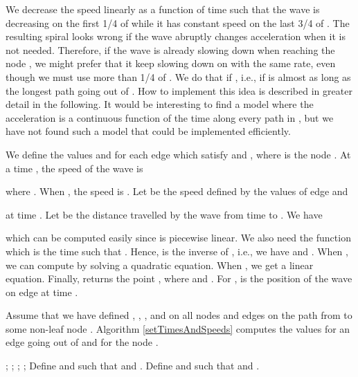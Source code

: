 \documentclass[3p]{elsarticle}
\begin{document}
We decrease the speed linearly
as a function of time such that the wave is decreasing on the first 1/4 of 
while it has constant speed on the last 3/4 of .
The resulting spiral looks wrong if the wave abruptly changes acceleration when it is not needed.
Therefore, if the wave is already slowing down when reaching the node , we might prefer that it keep
slowing down on  with the same rate, even though we must use more than 1/4
of . We do that if , i.e., if  is almost as long
as the longest path going out of .
How to implement this idea is described in greater detail in the following.
It would be interesting to find a model where the acceleration is a continuous function
of the time along every path in , but we have not found such a model that could be implemented
efficiently.

We define the values  and 
for each edge  which satisfy
 and ,
where  is the node .
At a time ,
the speed of the wave is

where
. When , the speed
is . Let  be the speed defined by the values of edge  and

at time . Let  be the distance travelled by the wave from time
 to .
We have

which can be computed easily since  is piecewise linear.
We also need the function  which is the time  such that .
Hence,  is the inverse of , i.e., we have
 and .
When , we can compute
 by solving a quadratic equation. When
, we get a linear equation.
Finally,  returns the point
,
where  and .
For ,  is the position of the wave on
edge  at time .

Assume that we have defined , , , and  on all
nodes and edges on the path from  to some non-leaf node .
Algorithm \ref{setTimesAndSpeeds} computes the values for an edge  going out of
 and for the node .

\begin{algorithm}[h]
\scriptsize
\LinesNumbered
\DontPrintSemicolon
\SetArgSty{}
; ; ; \;
\uIf{} {
  ; \;
} \Else {
  ; ; \;
}
\; 
\; 
\;
\If {}
{ 
  \;
   { 
    \; 
    \;
    \; 
    \If {} { 
      Define  and  such that 
      and .\; 
      \;
    }    
  }
  \If {} {
    Define  and  such that 
    and .\; 
  }
}
\; 
\; 
\caption{}
\label{setTimesAndSpeeds}
\end{algorithm}
\end{document}
